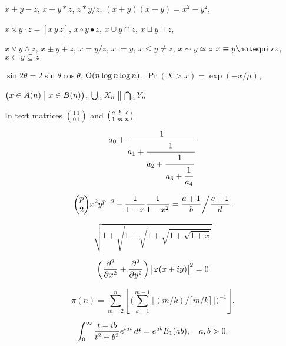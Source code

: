 


$x + y - z$, \quad $x + y * z$, \quad $z * y / z$, \quad 
$(x+y)(x-y) = x^2 - y^2$, 

$x \times y \cdot z = [x\, y\, z]$, \quad $x\circ y \bullet z$, \quad
$x\cup y \cap z$, \quad $x\sqcup y \sqcap z$, \quad

$x \vee y \wedge z$, \quad $x\pm y\mp z$, \quad
$x=y/z$, \quad $x:=y$, \quad $x\le y \ne z$, \quad $x \sim y \simeq z$
$x \equiv y \notequiv z$, \quad $x\subset y \subseteq z$

$\sin2\theta=2\sin\theta\cos\theta$, \quad
$\hbox{O}(n\log n\log n)$, \quad
$\Pr(X>x)=\exp(-x/\mu)$,

$\bigl(x\in A(n)\bigm|x\in B(n)\bigr)$, \quad
$\bigcup_n X_n\bigm\|\bigcap_n Y_n$


In text matrices $1\,1\choose0\,1$ and $\bigl({a\atop 1}{b\atop m}{c\atop n}\bigr)$


$$a_0+{1\over\displaystyle a_1 +
{\strut 1\over\displaystyle a_2 +
{\strut 1\over\displaystyle a_3 +
{\strut 1\over\displaystyle a_4}}}}$$


$${p \choose 2}x^2y^{p-2} - {1\over 1 - x}{1 \over 1 - x^2}
=
{a+1\over b}\bigg/{c+1\over d}.$$


$$\sqrt{1+\sqrt{1+\sqrt{1+\sqrt{1+\sqrt{1+x}}}}}$$


$$\left({\partial^2\over\partial x^2} + {\partial^2\over\partial y^2}\right)
\bigl|\varphi(x+iy)\bigr|^2=0$$



$$\pi(n)=\sum_{m=2}^n\left\lfloor\Biggl(\sum_{k=1}^{m-1}\bigl
\lfloor(m/k)\big/\lceil m/k\rceil\bigr\rfloor\Biggr)^{-1}\right\rfloor.$$


$$\int_0^\infty {t - i b\over t^2 + b^2}e^{iat}\,dt=e^{ab}E_1(ab), \quad
a,b > 0.$$


